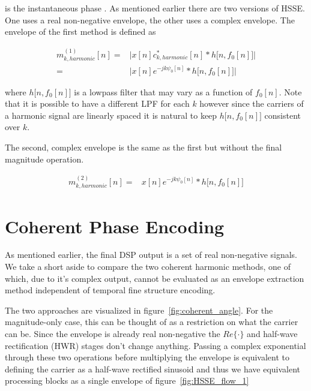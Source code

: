 \documentclass [11pt, proquest,oneside] {ganter_thesis}[2015/03/03]
\begin{document}
is the instantaneous phase \cite{clark2010modulation}.  As mentioned earlier there are two versions of HSSE. One uses a real non-negative envelope, the other uses a complex envelope.  The envelope of the first method is defined as

\begin{align}
m^{(1)}_{k,harmonic}[n] =& \Big| x[n] c_{k,harmonic}^*[n] * h\big[n, f_0[n] \big] \Big| \nonumber \\
=& \Big| x[n] e^{-jk\psi_0 [n]} * h\big[n, f_0[n] \big] \Big|
\end{align}

where $h\big[n, f_0[n] \big]$ is a lowpass filter that may vary as a function of $f_0[n]$.  Note that it is possible to have a different LPF for each $k$ however since the carriers of a harmonic signal are linearly spaced it is natural to keep $h\big[n, f_0[n] \big]$ consistent over $k$.

The second, complex envelope is the same as the first but without the final magnitude operation.

\begin{align}
m^{(2)}_{k,harmonic}[n] =& x[n] e^{-jk\psi_0 [n]} * h\big[n, f_0[n] \big]
\end{align}

\section{Coherent Phase Encoding}\label{section:coherent_phase}

As mentioned earlier, the final DSP output is a set of real non-negative signals.  We take a short aside to compare the two coherent harmonic methods, one of which, due to it's complex output, cannot be evaluated as an envelope extraction method independent of temporal fine structure encoding.

The two approaches are visualized in figure~\ref{fig:coherent_angle}.  For the magnitude-only case, this can be thought of as a restriction on what the carrier can be.  Since the envelope is already real non-negative the $Re\{\cdot\}$ and half-wave rectification (HWR) stages don't change anything.  Passing a complex exponential through these two operations before multiplying the envelope is equivalent to defining the carrier as a half-wave rectified sinusoid and thus we have equivalent processing blocks as a single envelope of figure~\ref{fig:HSSE_flow_1}
\end{document}

